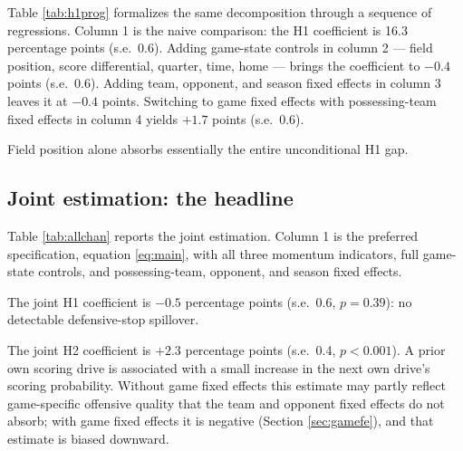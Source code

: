 \documentclass[11pt]{article}
\begin{document}
Table \ref{tab:h1prog} formalizes the same decomposition through a sequence
of regressions. Column 1 is the naive comparison: the H1 coefficient is
16.3 percentage points (s.e.\ 0.6). Adding game-state controls in column 2
--- field position, score differential, quarter, time, home --- brings the
coefficient to $-0.4$ points (s.e.\ 0.6). Adding team, opponent, and season
fixed effects in column 3 leaves it at $-0.4$ points. Switching to game fixed
effects with possessing-team fixed effects in column 4 yields $+1.7$ points
(s.e.\ 0.6).



Field position alone absorbs essentially the entire unconditional H1 gap.

\subsection{Joint estimation: the headline}\label{sec:joint}

Table \ref{tab:allchan} reports the joint estimation. Column 1 is the
preferred specification, equation \eqref{eq:main}, with all three momentum
indicators, full game-state controls, and possessing-team, opponent, and
season fixed effects.



The joint H1 coefficient is $-0.5$ percentage points (s.e.\ 0.6,
$p=0.39$): no detectable defensive-stop spillover.

The joint H2 coefficient is $+2.3$ percentage points (s.e.\ 0.4,
$p<0.001$). A prior own scoring drive is associated with a small increase
in the next own drive's scoring probability. Without game fixed effects this
estimate may partly reflect game-specific offensive quality that the team
and opponent fixed effects do not absorb; with game fixed effects it is
negative (Section \ref{sec:gamefe}), and that estimate is biased downward.
\end{document}
